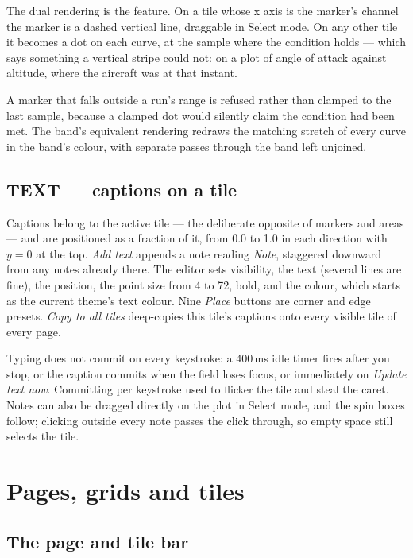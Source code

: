 \documentclass[11pt,a4paper,oneside]{report}
\begin{document}
The dual rendering is the feature. On a tile whose x axis is the marker's channel
the marker is a dashed vertical line, draggable in Select mode. On any other tile
it becomes a dot on each curve, at the sample where the condition holds --- which
says something a vertical stripe could not: on a plot of angle of attack against
altitude, where the aircraft was at that instant.

A marker that falls outside a run's range is refused rather than clamped to the
last sample, because a clamped dot would silently claim the condition had been
met. The band's equivalent rendering redraws the matching stretch of every curve
in the band's colour, with separate passes through the band left unjoined.

\section{TEXT --- captions on a tile}

Captions belong to the active tile --- the deliberate opposite of markers and
areas --- and are positioned as a fraction of it, from 0.0 to 1.0 in each
direction with $y = 0$ at the top. \emph{Add text} appends a note reading
\emph{Note}, staggered downward from any notes already there. The editor sets
visibility, the text (several lines are fine), the position, the point size from
4 to 72, bold, and the colour, which starts as the current theme's text colour.
Nine \emph{Place} buttons are corner and edge presets. \emph{Copy to all tiles}
deep-copies this tile's captions onto every visible tile of every page.

Typing does not commit on every keystroke: a 400\,ms idle timer fires after you
stop, or the caption commits when the field loses focus, or immediately on
\emph{Update text now}. Committing per keystroke used to flicker the tile and
steal the caret. Notes can also be dragged directly on the plot in Select mode,
and the spin boxes follow; clicking outside every note passes the click through,
so empty space still selects the tile.

\chapter{Pages, grids and tiles}
\label{ch:pages}

\section{The page and tile bar}
\end{document}
